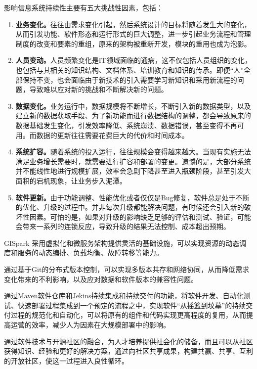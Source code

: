 \documentclass[letterpaper,10pt,english]{sphinxmanual}
\begin{document}
影响信息系统持续性主要有五大挑战性因素，包括：
\begin{enumerate}
\item {} 
\textbf{业务变化。}往往由需求变化引起，然后系统设计的目标将随着发生大的变化，从而引发功能、软件形态和运行形式的巨大调整，进一步引起业务流程和管理制度的改变和要素的重组，原来的架构被重新开发，模块的重用也成为泡影。

\item {} 
\textbf{人员变动。}人员频繁变化是IT领域面临的通病，这不仅包括人员组织的变化，也包括与其相关的知识结构、文档体系、培训教育和知识的传承。即便“人”全部保持不变，也会面临由于新技术的引入需要学习新知识和采用新流程的问题，导致难以应对新的挑战和不断解决新的问题。

\item {} 
\textbf{数据变化。}业务运行中，数据规模将不断增长，不断引入新的数据类型，以及建立新的数据获取手段、为了新功能而进行数据结构的调整，都会导致原来的数据基础发生变化，引发效率降低、系统崩溃、数据错误，甚至变得不再可用。而数据的更新往往需要花费巨大的代价和时间成本。

\item {} 
\textbf{系统扩容。}随着系统的投入运行，往往规模会变得越来越大。当现有实施无法满足业务增长需要时，就需要进行扩容和部署的变更。遗憾的是，大部分系统并不能线性地进行规模扩展，效率会急剧下降甚至进入瓶颈阶段，甚至引发大面积的宕机现象，让业务步入泥潭。

\item {} 
\textbf{软件更新。}由于功能调整、性能优化或者仅仅是Bug修复，软件总是处于不断的优化、升级的过程中。并非每次升级都能解决问题，有时候还会引入新的破坏性因素。可怕的是，如果对升级的影响缺乏足够的评估和测试、验证，可能会带来一系列的连锁反应，导致升级的结果无法控制、成本超出预期。

\end{enumerate}

GISpark
采用虚拟化和微服务架构提供灵活的基础设施，可以实现资源的动态调度和服务的动态编排、负载均衡、故障转移等能力。

通过基于Git的分布式版本控制，可以实现多版本共存和网络协同，从而降低需求变化带来的不利影响，以及应对数据和软件版本的兼容性问题。

通过Maven软件仓库和Jekins持续集成和持续交付的功能，将软件开发、自动化测试、快速部署过程集成到一个预定的流程之中，实现软件“从摇篮到坟墓”的持续交付过程的规范化和自动化，可以将原有的组件和代码实现更高程度的复用，从而提高运营的效率，减少人为因素在大规模部署中的影响。

通过软件技术与开源社区的融合，为人才培养提供社会化的储备，而且可以从社区获得知识、经验和更好的解决方案，通过向社区共享成果，构建共赢、共享、互利的开放社区，使这一过程进入良性循环。
\end{document}
